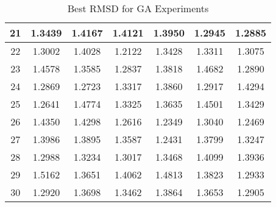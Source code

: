 \begin{table}
\begin{tabular}{ | c | c | c | c | c | c | c | }
		21 & 1.3439 & 1.4167 & 1.4121 & 1.3950 & 1.2945 & 1.2885 \\ \hline
		22 & 1.3002 & 1.4028 & 1.2122 & 1.3428 & 1.3311 & 1.3075 \\ \hline
		23 & 1.4578 & 1.3585 & 1.2837 & 1.3818 & 1.4682 & 1.2890 \\ \hline
		24 & 1.2869 & 1.2723 & 1.3317 & 1.3860 & 1.2917 & 1.4294 \\ \hline
		25 & 1.2641 & 1.4774 & 1.3325 & 1.3635 & 1.4501 & 1.3429 \\ \hline
		26 & 1.4350 & 1.4298 & 1.2616 & 1.2349 & 1.3040 & 1.2469 \\ \hline
		27 & 1.3986 & 1.3895 & 1.3587 & 1.2431 & 1.3799 & 1.3247 \\ \hline
		28 & 1.2988 & 1.3234 & 1.3017 & 1.3468 & 1.4099 & 1.3936 \\ \hline
		29 & 1.5162 & 1.3651 & 1.4062 & 1.4813 & 1.3823 & 1.2933 \\ \hline
		30 & 1.2920 & 1.3698 & 1.3462 & 1.3864 & 1.3653 & 1.2905 \\ \hline
	\end{tabular}
	\caption{Best RMSD for GA Experiments}
\end{table}

